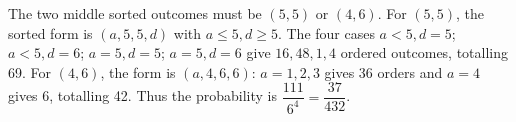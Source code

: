 The two middle sorted outcomes must be $(5,5)$ or $(4,6)$. For $(5,5)$, the sorted form is $(a,5,5,d)$ with $a\le5,d\ge5$. The four cases $a<5,d=5$; $a<5,d=6$; $a=5,d=5$; $a=5,d=6$ give $16,48,1,4$ ordered outcomes, totalling 69. For $(4,6)$, the form is $(a,4,6,6)$: $a=1,2,3$ gives 36 orders and $a=4$ gives 6, totalling 42. Thus the probability is $\dfrac{111}{6^4}=\boxed{\dfrac{37}{432}}$.
